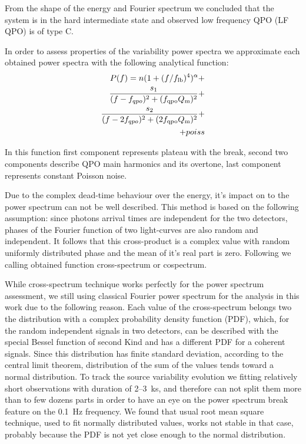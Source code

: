 \documentclass[a4paper,fleqn,usenatbib]{mnras}
\begin{document}
    From the shape of the energy and Fourier spectrum we concluded that the system is in the hard intermediate state and observed low frequency QPO (LF QPO) is of type C. 

    In order to assess properties of the variability power spectra we approximate each obtained power spectra with the following analytical function:
\begin{equation}
        \begin{split}
        P(f) = n (1 + (f/f_{\rm lb})^4)^{\alpha} + \\
        \frac{s_1}{(f - f_{qpo})^2 + (f_{\rm qpo} Q_{\rm m})^2} +\\
        \frac{s_2}{(f - 2f_{qpo})^2 + (2f_{\rm qpo} Q_{\rm m})^2} + \\
        + poiss
\end{split}
        \label{eq:complex_fit}
\end{equation}


In this function first component represents plateau with the break, second two components describe QPO main harmonics and its overtone, last component represents constant Poisson noise.

Due to the complex dead-time behaviour over the energy, it's impact on to the power spectrum can not be well described. 
This method is based on the following assumption: since photons arrival times are independent for the two detectors, phases of the Fourier function of two light-curves are also random and independent.
It follows that this cross-product is a complex value with random uniformly distributed phase and the mean of it's real part is zero.
Following \cite{2015ApJ...800..109B} we calling obtained function cross-spectrum or cospectrum. 

While cross-spectrum technique works perfectly for the power spectrum assessment, we still using classical Fourier power spectrum for the analysis in this work due to the following reason.
Each value of the cross-spectrum belongs two the distribution with a complex probability density function (PDF), which,  for the random independent signals in two detectors, can be described with the special Bessel function of second Kind and has a different PDF for a coherent signals. 
Since this distribution has finite standard deviation, according to the central limit theorem, distribution of the sum of the values tends toward a normal distribution.
To track the source variability evolution we fitting relatively short observations with duration of 2--3~ks, and therefore can not split them more than to few dozens parts in order to have an eye on the power spectrum break feature on the 0.1~Hz frequency. 
We found that usual root mean square technique, used to fit normally distributed values, works not stable in that case, probably because the PDF is not yet close enough to the normal distribution. 
\end{document}

